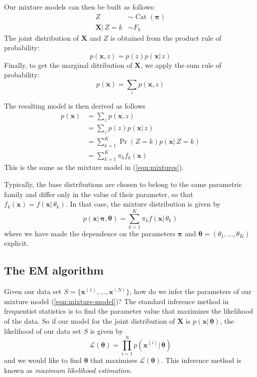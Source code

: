 \documentclass[final,3p,times,twocolumn]{elsarticle}
\DeclareMathOperator*{\Cat}{Cat}
\let\bs\boldsymbol
\begin{document}
Our mixture models can then be built as follows:
\begin{equation}
\begin{split}
\label{eqn:mixture-lvm}
Z &\sim \Cat(\bs\pi)\\
\bs X |\,Z=k &\sim F_k
\end{split}
\end{equation}
The joint distribution of $\bs X$ and $Z$ is obtained from the product rule of probability:
\begin{equation}
\label{eqn:product-rule}
p(\bs x, z) = p(z)p(\bs x|\,z)
\end{equation}
Finally, to get the marginal ditribution of $\bs X$, we apply the sum rule of probability:
\begin{equation}
\label{eqn:sum-rule}
p(\bs x) = \sum_z p(\bs x, z)
\end{equation}

The resulting model is then derived as follows
\begin{equation}
\label{eqn:mixture-derivation}
\begin{split}
p(\bs x) &= \sum_z p(\bs x, z)\\
&= \sum_z p(z)p(\bs x|\,z)\\
&= \sum_{k=1}^K \Pr(Z=k) p(\bs x|\,Z=k)\\
&= \sum_{k=1}^K \pi_k f_k(\bs x)
\end{split}
\end{equation}
This is the same as the mixture model in (\ref{eqn:mixtures}).

Typically, the base distributions are chosen to belong to the same parametric family and differ only in the value of their parameter, so that $f_k(\bs x) = f(\bs x|\, \theta_k)$.
In that case, the mixture distribution is given by
\begin{equation}
\label{eqn:mixture-model}
p(\bs x|\,\bs\pi,\bs\theta) = \sum_{k=1}^K \pi_k f(\bs x|\,\theta_k)
\end{equation}
where we have made the dependence on the parameters $\bs\pi$ and $\bs\theta = (\theta_1,\dots,\theta_K)$ explicit.


\subsection{The EM algorithm}
\label{sect:EM}
Given our data set $S=\{\bs x^{(1)},\dots,\bs x^{(N)}\}$, how do we infer the parameters of our mixture model (\ref{eqn:mixture-model})?
The standard inference method in frequentist statistics is to find the parameter value that maximizes the likelihood of the data. 
So if our model for the joint distribution of $\bs X$ is $p(\bs x|\,\bs\theta)$, the likelihood of our data set $S$ is given by
\begin{equation}
\label{eqn:likelihood}
\mathcal{L}(\bs\theta) = \prod_{i=1}^N p(\bs x^{(i)}|\,\bs \theta)
\end{equation}
and we would like to find $\bs \theta$ that maximises $\mathcal{L}(\bs\theta)$.
This inference method is known as \emph{maximum likelihood estimation}. 
\end{document}
